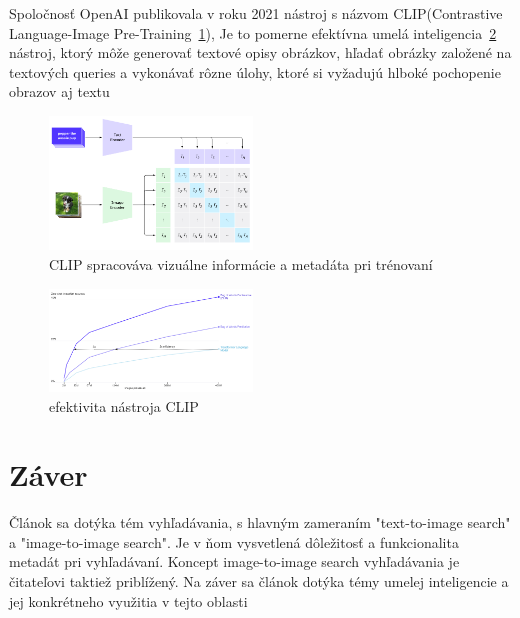 \documentclass[10pt,twoside,slovak,a4paper]{article}
\begin{document}
Spoločnosť OpenAI publikovala v roku 2021 nástroj s názvom CLIP(Contrastive Language-Image Pre-Training~\ref{clip}), Je to pomerne efektívna umelá inteligencia~\ref{clip_efektivita} nástroj, ktorý môže generovať textové opisy obrázkov, hľadať obrázky založené na textových queries a vykonávať rôzne úlohy, ktoré si vyžadujú hlboké pochopenie obrazov aj textu
\begin{figure}[htb!]\label{clip}
  \centering
  \includegraphics[width=0.48\textwidth]{images/image_encoding.png} 
  \caption{CLIP spracováva vizuálne informácie a metadáta pri trénovaní}
\end{figure}
\begin{figure}[htb!]\label{clip_efektivita}
  \centering
  \includegraphics[width=0.48\textwidth]{images/CLIP.png} 
  \caption{efektivita nástroja CLIP}
\end{figure}

\section{Záver} \label{zaver} %
Článok sa dotýka tém vyhľadávania, s hlavným zameraním "text-to-image search" a "image-to-image search". Je v ňom vysvetlená dôležitosť a funkcionalita metadát pri vyhľadávaní. Koncept image-to-image search vyhľadávania je čitateľovi taktiež priblížený. Na záver sa článok dotýka témy umelej inteligencie a jej konkrétneho využitia v tejto oblasti

\newpage


\end{document}
